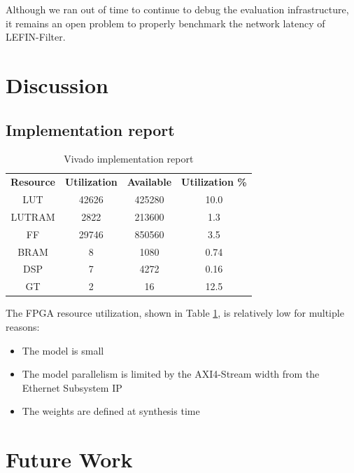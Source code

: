 \documentclass[conference]{IEEEtran}
\begin{document}
Although we ran out of time to continue to debug the evaluation
infrastructure, it remains an open problem to properly benchmark
the network latency of LEFIN-Filter.

\section{Discussion}
\subsection{Implementation report}
\begin{table}[t]
    \centering
    \begin{tabular}{cccc}
        \textbf{Resource} & \textbf{Utilization} & \textbf{Available} & \textbf{Utilization \%} \\
        LUT               & 42626                & 425280             & 10.0                    \\
        LUTRAM            & 2822                 & 213600             & 1.3                     \\
        FF                & 29746                & 850560             & 3.5                     \\
        BRAM              & 8                    & 1080               & 0.74                    \\
        DSP               & 7                    & 4272               & 0.16                    \\
        GT                & 2                    & 16                 & 12.5
    \end{tabular}
    \caption{Vivado implementation report}
    \label{tab:imp_rep}
\end{table}

The FPGA resource utilization, shown in Table \ref{tab:imp_rep},
is relatively low for multiple reasons:
\begin{itemize}
    \item The model is small
    \item The model parallelism is limited by the
          AXI4-Stream width from the Ethernet Subsystem IP
    \item The weights are defined at synthesis time
\end{itemize}

\section{Future Work}
\end{document}
